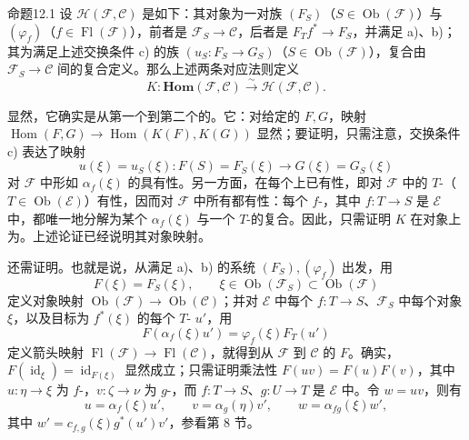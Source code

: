 \begin{SGAresult}{命题}{12.1}
设 $\mathcal H(\mathcal F,\mathcal C)$ 是如下：其对象为一对族 $(F_S)$（$S\in\operatorname{Ob}(\mathcal F)$）与 $(\varphi_f)$（$f\in\operatorname{Fl}(\mathcal F)$），前者是 $\mathcal F_S\to\mathcal C$，后者是 $F_Tf^*\to F_S$，并满足 a)、b)；其为满足上述交换条件 c) 的族 $(u_S:F_S\to G_S)$（$S\in\operatorname{Ob}(\mathcal F)$），复合由 $\mathcal F_S\to\mathcal C$ 间的复合定义。那么上述两条对应法则定义
\[
 K:\mathbf{Hom}(\mathcal F,\mathcal C)\xrightarrow{\sim}\mathcal H(\mathcal F,\mathcal C).
\]
\end{SGAresult}
显然，它确实是从第一个到第二个的。它：对给定的 $F,G$，映射 $\operatorname{Hom}(F,G)\to\operatorname{Hom}(K(F),K(G))$ 显然；要证明，只需注意，交换条件 c) 表达了映射
\[
 u(\xi)=u_S(\xi):F(S)=F_S(\xi)\longrightarrow G(\xi)=G_S(\xi)
\]
对 $\mathcal F$ 中形如 $\alpha_f(\xi)$ 的具有性。另一方面，在每个上已有性，即对 $\mathcal F$ 中的 $T$-（$T\in\operatorname{Ob}(\mathcal E)$）有性，因而对 $\mathcal F$ 中所有都有性：每个 $f$-，其中 $f:T\to S$ 是 $\mathcal E$ 中，都唯一地分解为某个 $\alpha_f(\xi)$ 与一个 $T$-的复合。因此，只需证明 $K$ 在对象上为。上述论证已经说明其对象映射。

还需证明。也就是说，从满足 a)、b) 的系统 $(F_S),(\varphi_f)$ 出发，用
\[
 F(\xi)=F_S(\xi),\qquad\xi\in\operatorname{Ob}(\mathcal F_S)\subset\operatorname{Ob}(\mathcal F)
\]
定义对象映射 $\operatorname{Ob}(\mathcal F)\to\operatorname{Ob}(\mathcal C)$；并对 $\mathcal E$ 中每个 $f:T\to S$、$\mathcal F_S$ 中每个对象 $\xi$，以及目标为 $f^*(\xi)$ 的每个 $T$- $u'$，用
\[
 F(\alpha_f(\xi)u')=\varphi_f(\xi)F_T(u')
\]
定义箭头映射 $\operatorname{Fl}(\mathcal F)\to\operatorname{Fl}(\mathcal C)$，就得到从 $\mathcal F$ 到 $\mathcal C$ 的 $F$。确实，$F(\operatorname{id}_{\xi})=\operatorname{id}_{F(\xi)}$ 显然成立；只需证明乘法性 $F(uv)=F(u)F(v)$，其中 $u:\eta\to\xi$ 为 $f$-，$v:\zeta\to\nu$ 为 $g$-，而 $f:T\to S$、$g:U\to T$ 是 $\mathcal E$ 中。令 $w=uv$，则有
\[
 u=\alpha_f(\xi)u',\qquad v=\alpha_g(\eta)v',\qquad w=\alpha_{fg}(\xi)w',
\]
其中 $w'=c_{f,g}(\xi)g^*(u')v'$，参看第 8 节。

